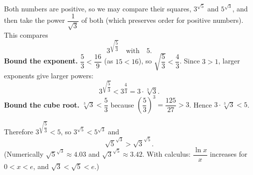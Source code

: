 Both numbers are positive, so we may compare their squares, $3^{\sqrt5}$ and $5^{\sqrt3}$, and then take the power $\dfrac{1}{\sqrt3}$ of both (which preserves order for positive numbers). This compares
\[
3^{\sqrt{\dfrac{5}{3}}}\quad\text{with}\quad 5 .
\]
\textbf{Bound the exponent.} $\dfrac{5}{3}<\dfrac{16}{9}$ (as $15<16$), so $\sqrt{\dfrac{5}{3}}<\dfrac{4}{3}$. Since $3>1$, larger exponents give larger powers:
\[
3^{\sqrt{\dfrac{5}{3}}}<3^{\dfrac{4}{3}}=3\cdot\sqrt[3]{3}.
\]
\textbf{Bound the cube root.} $\sqrt[3]{3}<\dfrac{5}{3}$ because $\left(\dfrac{5}{3}\right)^3=\dfrac{125}{27}>3$. Hence $3\cdot\sqrt[3]3<5$.

Therefore $3^{\sqrt{\dfrac{5}{3}}}<5$, so $3^{\sqrt5}<5^{\sqrt3}$ and
\[
\boxed{\sqrt5^{\sqrt3}>\sqrt3^{\sqrt5}} .
\]
(Numerically $\sqrt5^{\sqrt3}\approx4.03$ and $\sqrt3^{\sqrt5}\approx3.42$. With calculus: $\dfrac{\ln x}{x}$ increases for $0<x<e$, and $\sqrt3<\sqrt5<e$.)
